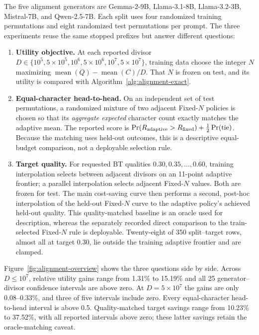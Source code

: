 The five alignment generators are Gemma-2-9B, Llama-3.1-8B,
Llama-3.2-3B, Mistral-7B, and Qwen-2.5-7B.  Each split uses four randomized
training permutations and eight randomized test permutations per prompt.
The three experiments reuse the same stopped prefixes but answer different
questions:
\begin{enumerate}
  \item \textbf{Utility objective.}  At each reported divisor
  $D\in\{10^5,5\!\times\!10^5,10^6,5\!\times\!10^6,10^7,5\!\times\!10^7\}$,
  training data choose the integer $N$ maximizing
  $\operatorname{mean}(Q)-\operatorname{mean}(C)/D$.  That $N$ is frozen on
  test, and its utility is compared with Algorithm~\ref{alg:alignment-exact}.

  \item \textbf{Equal-character head-to-head.}  On an independent set of test
  permutations, a randomized mixture of two adjacent Fixed-$N$ policies is
  chosen so that its \emph{aggregate expected} character count exactly matches
  the adaptive mean.  The reported score is
  $\Pr(R_{\rm adaptive}>R_{\rm fixed})+\tfrac12\Pr(\text{tie})$.  Because the
  matching uses held-out outcomes, this is a descriptive equal-budget
  comparison, not a deployable selection rule.

  \item \textbf{Target quality.}  For requested BT qualities
  $0.30,0.35,\ldots,0.60$, training interpolation selects between adjacent
  divisors on an 11-point adaptive frontier; a parallel interpolation selects
  adjacent Fixed-$N$ values.  Both are frozen for test.  The main cost-saving
  curve then performs a second, post-hoc interpolation of the held-out
  Fixed-$N$ curve to the adaptive policy's achieved held-out quality.  This
  quality-matched baseline is an oracle used for description, whereas the
  separately recorded direct comparison to the train-selected Fixed-$N$ rule
  is deployable.  Twenty-eight of 350 split--target rows, almost all at target
  0.30, lie outside the training adaptive frontier and are clamped.
\end{enumerate}

Figure~\ref{fig:alignment-overview} shows the three questions side by side.
Across $D\le10^7$, relative utility gains range from 1.31\% to 15.19\% and all
25 generator--divisor confidence intervals are above zero.  At
$D=5\times10^7$ the gains are only 0.08--0.33\%, and three of five intervals
include zero.  Every equal-character head-to-head interval is above 0.5.
Quality-matched target savings range from 10.23\% to 37.52\%, with all reported
intervals above zero; these latter savings retain the oracle-matching caveat.

